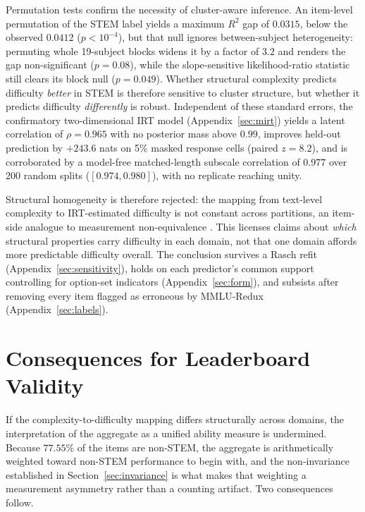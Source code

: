 Permutation tests confirm the necessity of cluster-aware inference. An item-level permutation of the STEM label yields a maximum $R^{2}$ gap of $0.0315$, below the observed $0.0412$ ($p < 10^{-4}$), but that null ignores between-subject heterogeneity: permuting whole 19-subject blocks widens it by a factor of $3.2$ and renders the gap non-significant ($p = 0.08$), while the slope-sensitive likelihood-ratio statistic still clears its block null ($p = 0.049$). Whether structural complexity predicts difficulty \emph{better} in STEM is therefore sensitive to cluster structure, but whether it predicts difficulty \emph{differently} is robust. Independent of these standard errors, the confirmatory two-dimensional IRT model (Appendix~\ref{sec:mirt}) yields a latent correlation of $\rho = 0.965$ with no posterior mass above $0.99$, improves held-out prediction by $+243.6$ nats on 5\% masked response cells (paired $z = 8.2$), and is corroborated by a model-free matched-length subscale correlation of $0.977$ over 200 random splits ($[0.974,0.980]$), with no replicate reaching unity.

Structural homogeneity is therefore rejected: the mapping from text-level complexity to IRT-estimated difficulty is not constant across partitions, an item-side analogue to measurement non-equivalence \citep{meredith1993}. This licenses claims about \emph{which} structural properties carry difficulty in each domain, not that one domain affords more predictable difficulty overall. The conclusion survives a Rasch refit (Appendix~\ref{sec:sensitivity}), holds on each predictor's common support controlling for option-set indicators (Appendix~\ref{sec:form}), and subsists after removing every item flagged as erroneous by MMLU-Redux (Appendix~\ref{sec:labels}).

\section{Consequences for Leaderboard Validity}\label{consequences-for-leaderboard-validity}

If the complexity-to-difficulty mapping differs structurally across domains, the interpretation of the aggregate as a unified ability measure is undermined. Because $77.55\%$ of the items are non-STEM, the aggregate is arithmetically weighted toward non-STEM performance to begin with, and the non-invariance established in Section~\ref{sec:invariance} is what makes that weighting a measurement asymmetry rather than a counting artifact. Two consequences follow.

